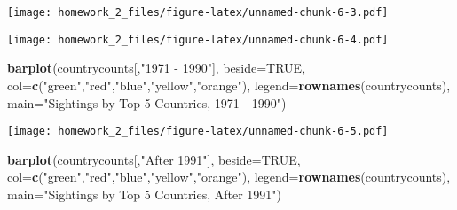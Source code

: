 \documentclass[
]{article}
\newenvironment{Shaded}{\begin{snugshade}}{\end{snugshade}}
\newcommand{\DataTypeTok}[1]{\textcolor[rgb]{0.13,0.29,0.53}{#1}}
\newcommand{\KeywordTok}[1]{\textcolor[rgb]{0.13,0.29,0.53}{\textbf{#1}}}
\newcommand{\NormalTok}[1]{#1}
\newcommand{\OperatorTok}[1]{\textcolor[rgb]{0.81,0.36,0.00}{\textbf{#1}}}
\newcommand{\OtherTok}[1]{\textcolor[rgb]{0.56,0.35,0.01}{#1}}
\newcommand{\StringTok}[1]{\textcolor[rgb]{0.31,0.60,0.02}{#1}}
\begin{document}
\texttt{[image: homework\_2\_files/figure-latex/unnamed-chunk-6-3.pdf]}

\begin{Shaded}
\end{Shaded}

\texttt{[image: homework\_2\_files/figure-latex/unnamed-chunk-6-4.pdf]}

\begin{Shaded}
\begin{Highlighting}[]
\KeywordTok{barplot}\NormalTok{(countrycounts[,}\StringTok{"1971 - 1990"}\NormalTok{], }\DataTypeTok{beside=}\OtherTok{TRUE}\NormalTok{, }\DataTypeTok{col=}\KeywordTok{c}\NormalTok{(}\StringTok{"green"}\NormalTok{,}\StringTok{"red"}\NormalTok{,}\StringTok{"blue"}\NormalTok{,}\StringTok{"yellow"}\NormalTok{,}\StringTok{"orange"}\NormalTok{),}
        \DataTypeTok{legend=}\KeywordTok{rownames}\NormalTok{(countrycounts), }\DataTypeTok{main=}\StringTok{"Sightings by Top 5 Countries, 1971 - 1990"}\NormalTok{)}
\end{Highlighting}
\end{Shaded}

\texttt{[image: homework\_2\_files/figure-latex/unnamed-chunk-6-5.pdf]}

\begin{Shaded}
\begin{Highlighting}[]
\KeywordTok{barplot}\NormalTok{(countrycounts[,}\StringTok{"After 1991"}\NormalTok{], }\DataTypeTok{beside=}\OtherTok{TRUE}\NormalTok{, }\DataTypeTok{col=}\KeywordTok{c}\NormalTok{(}\StringTok{"green"}\NormalTok{,}\StringTok{"red"}\NormalTok{,}\StringTok{"blue"}\NormalTok{,}\StringTok{"yellow"}\NormalTok{,}\StringTok{"orange"}\NormalTok{),}
        \DataTypeTok{legend=}\KeywordTok{rownames}\NormalTok{(countrycounts), }\DataTypeTok{main=}\StringTok{"Sightings by Top 5 Countries, After 1991"}\NormalTok{)}
\end{Highlighting}
\end{Shaded}
\end{document}
